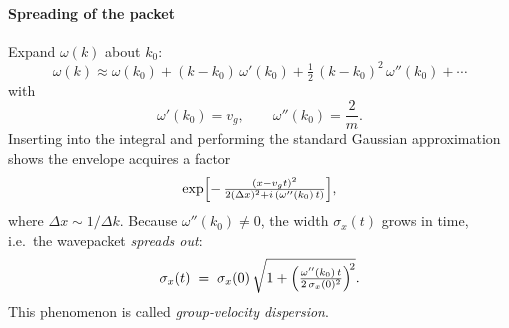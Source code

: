 \documentclass[a4paper,12pt]{report}
\begin{document}
\paragraph{Spreading of the packet}
Expand \(\omega(k)\) about \(k_0\):
\[
\omega(k) \approx \omega(k_0)
  + (k-k_0)\,\omega'(k_0)
  + \tfrac12\,(k-k_0)^2\,\omega''(k_0)
  + \cdots
\]
with
\[
\omega'(k_0) = v_g,
\qquad
\omega''(k_0) = \frac{2}{m}.
\]
Inserting into the integral and performing the standard Gaussian approximation shows the envelope acquires a factor
\[
\exp\Bigl[-\,\tfrac{(x - v_g t)^2}{2(\Delta x)^2 + i\,(\omega''(k_0)\,t)}\Bigr],
\]
where \(\Delta x\sim1/\Delta k\).  Because \(\omega''(k_0)\neq0\), the width
\(\sigma_x(t)\) grows in time, i.e.\ the wavepacket \emph{spreads out}:
\[
\sigma_x(t) \;=\;\sigma_x(0)\,\sqrt{1 + \Bigl(\tfrac{\omega''(k_0)\,t}{2\,\sigma_x(0)^2}\Bigr)^{\!2}}.
\]
This phenomenon is called \emph{group‐velocity dispersion}.  
\end{document}
